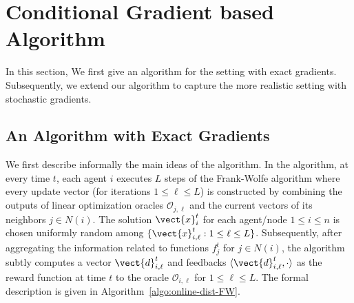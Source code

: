 \section{Conditional Gradient based Algorithm}
\label{chap:formulation}

In this section, We first give an algorithm for the setting with exact gradients. Subsequently, we extend our algorithm to capture the more realistic setting with stochastic gradients. 

\subsection{An Algorithm with Exact Gradients}
\label{sec:exact}


We first describe informally the main ideas of the algorithm. In the algorithm, at every time $t$, each agent $i$ executes $L$ steps of the Frank-Wolfe algorithm 
where every update vector (for iterations $1 \leq \ell \leq L$) is constructed by 
combining the outputs of linear optimization oracles $\mathcal{O}_{j,\ell}$
and the current vectors of its neighbors $j \in N(i)$.  
The solution $\vect{x}_{i}^{t}$ for each agent/node $1 \leq i \leq n$ is chosen uniformly random among $\{\vect{x}_{i,\ell}^{t}: 1 \leq \ell \leq L\}$.
Subsequently, after aggregating the information related to functions $f_{j}^{t}$
for $j \in N(i)$, the algorithm subtly computes a vector $\vect{d}^{t}_{i,\ell}$ and feedbacks  
$\langle \vect{d}^t_{i,\ell}, \cdot \rangle$ as the reward function at time $t$ to the oracle $\mathcal{O}_{i,\ell}$ for $1 \leq \ell \leq L$.
The formal description is given in Algorithm~\ref{algo:online-dist-FW}.


